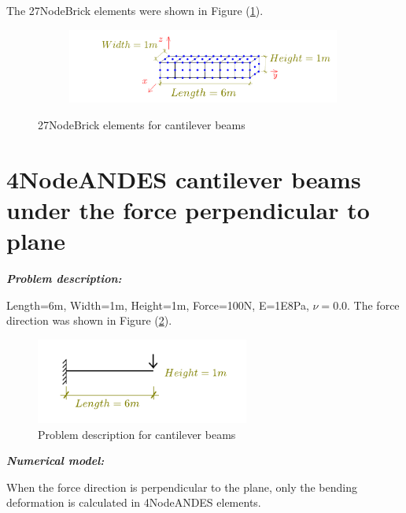 \documentclass[fleqn,11pt,letter]{article}
\begin{document}
The 27NodeBrick elements were shown in Figure (\ref{fig 8NodeBrick elements for cantilever beams}).

\begin{figure}[H]
  \centering
  \begin{subfigure}{0.5\textwidth}
    \centering
    \includegraphics[width=9cm]{../Figure_files/27NodeBrick/beam_27brick_6div.pdf}
  \end{subfigure}
  \captionsetup{justification=centering,margin=3cm}
  \caption{27NodeBrick elements for cantilever beams}
  \label{fig 8NodeBrick elements for cantilever beams}
\end{figure}




\newpage
\section{4NodeANDES cantilever beams under the force perpendicular to plane}


\emph{\textbf{Problem description:}}


Length=6m, Width=1m, Height=1m, Force=100N, E=1E8Pa, $\nu=0.0$. The force direction was shown in Figure (\ref{fig Problem description for cantilever 4}). 

\begin{figure}[H]
  \centering
  \includegraphics[width=7cm]{../Figure_files/4NodeANDES/cantilever_6.pdf}
  \caption{Problem description for cantilever beams}
  \label{fig Problem description for cantilever 4}
\end{figure}


\noindent \emph{\textbf{Numerical model:}}

\vskip 12pt


When the force direction is perpendicular to the plane, only the bending deformation is calculated in 4NodeANDES elements. 
\end{document}

